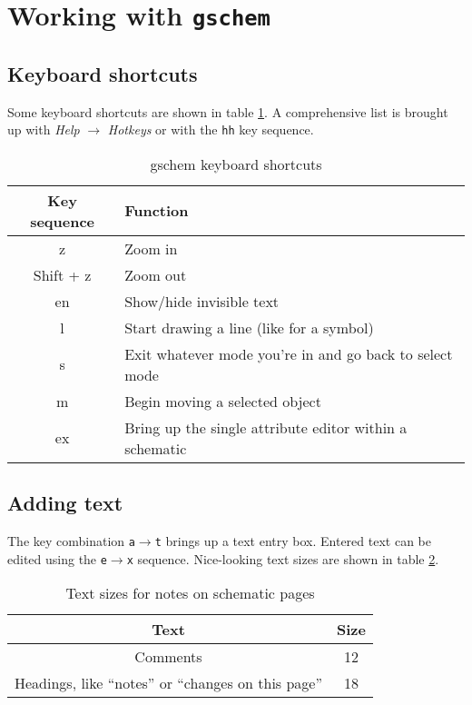 \section{Working with \texttt{gschem}}


\subsection{Keyboard shortcuts}
Some keyboard shortcuts are shown in table \ref{shortcuts}.  A comprehensive list is brought up with \textsl{Help} $\rightarrow$ \textsl{Hotkeys} or with the \texttt{hh} key sequence.

\begin{table}[h]
	\begin{center}
	\setlength{\extrarowheight}{0.5cm}
		\begin{tabular}{cl}
		Key sequence	&Function\\
		\hline
		z		&Zoom in\\
		Shift + z	&Zoom out\\
		en		&Show/hide invisible text\\
		l		&Start drawing a line (like for a symbol)\\
		s		&Exit whatever mode you're in and go back to select mode\\
		m		&Begin moving a selected object\\
		ex		&Bring up the single attribute editor within a schematic\\
		\end{tabular}
		\caption{gschem keyboard shortcuts \label{shortcuts}}
	\end{center}
\end{table}

\subsection{Adding text}
The key combination \texttt{a}$\rightarrow$\texttt{t} brings up a text entry box.  Entered text can be edited using the \texttt{e}$\rightarrow$\texttt{x} sequence.  Nice-looking text sizes are shown in table \ref{text_sizes}.

\begin{table}[ht]
	\begin{center}
		\begin{tabular}{|c|c|}
		\hline
		\textbf{Text}	&\textbf{Size}\\
		\hline \hline
		Comments	&12\\
		\hline
		Headings, like ``notes'' or ``changes on this page''	&18\\
		\hline
		\end{tabular}
		\caption{Text sizes for notes on schematic pages\label{text_sizes}}
	\end{center}
\end{table}


